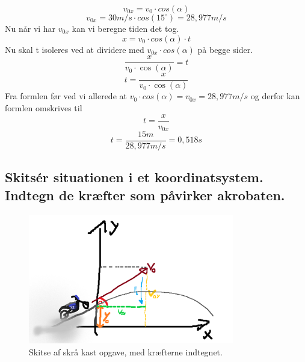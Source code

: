 \begin{equation*}
    v_{0x}=v_{0}\cdot cos(\alpha)
\end{equation*}
\begin{equation*}
    v_{0x}=30m/s\cdot cos(15^{\circ}) = 28,977 m/s
\end{equation*}
Nu når vi har \begin{math}v_{0x}\end{math} kan vi beregne tiden det tog.
\begin{equation*}
    x=v_{0}\cdot cos(\alpha)\cdot t
\end{equation*}
Nu skal t isoleres ved at dividere med \begin{math}v_{0x}\cdot cos(\alpha)\end{math} på begge sider.
\begin{equation*}
    \frac{x}{v_{0}\cdot \cos(\alpha)}=t
\end{equation*}
\begin{equation*}
    t=\frac{x}{v_{0}\cdot \cos(\alpha)}
\end{equation*}
Fra formlen før ved vi allerede at \begin{math}v_{0}\cdot cos(\alpha) = v_{0x} = 28,977m/s\end{math} og derfor kan formlen omskrives til
\begin{equation*}
    t=\frac{x}{v_{0x}}
\end{equation*}
\begin{equation*}
    t=\frac{15m}{28,977m/s} = 0,518 s
\end{equation*}



\subsection{Skitsér situationen i et koordinatsystem. Indtegn de kræfter som påvirker akrobaten.}
\begin{figure}[h!]
    \centering
    \includegraphics[width=0.8\textwidth]{figures/moterhop.png}
    \caption{Skitse af skrå kast opgave, med kræfterne indtegnet.}
\end{figure}

